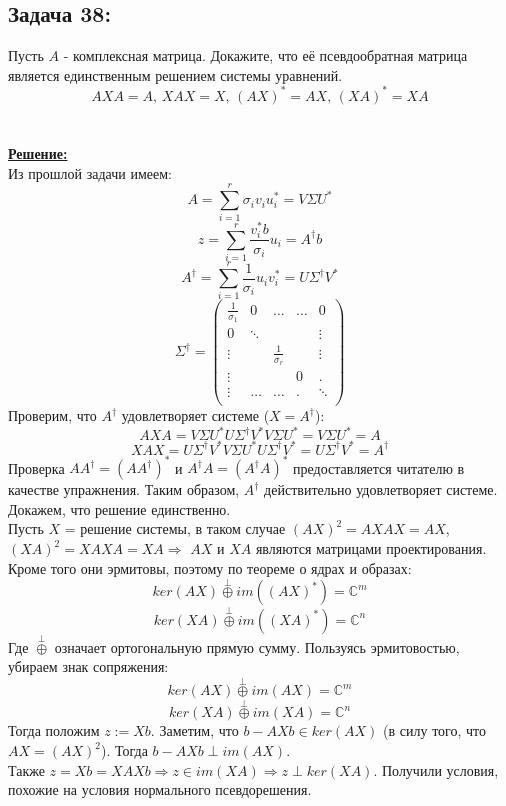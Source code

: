 \documentclass[a4paper,12pt,titlepage,final]{article}
\begin{document}
\subsection*{Задача 38:}
\noindent Пусть $A$ - комплексная матрица. Докажите, что её псевдообратная матрица является единственным решением системы уравнений.
$$AXA = A,\, XAX = X,\, (AX)^* = AX,\, (XA)^* = XA$$ \\ \\
\textbf{\underline{Решение:}} \\
Из прошлой задачи имеем:
$$A = \sum_{i=1}^{r}\sigma_i v_i u_i^* = V\Sigma U^*$$
$$z = \sum_{i=1}^{r} \frac{v_i^* b}{\sigma_i}u_i = A^\dagger b$$
$$A^\dagger = \sum_{i=1}^{r} \frac{1}{\sigma_i}u_i v_i^* = U\Sigma^\dagger V^*$$
$$\Sigma^\dagger = 
\begin{pmatrix}
\frac{1}{\sigma_1} & 0 & \ldots & \ldots & 0 \\
0 & \ddots &  &  & \vdots \\
\vdots & & \frac{1}{\sigma_r} & & \vdots \\
\vdots & & & 0 &. \\
\vdots & \ldots& \ldots&. & \ddots \\
\end{pmatrix}
$$
Проверим, что $A^\dagger$ удовлетворяет системе ($X = A^\dagger$):
$$AXA = V\Sigma U^*U\Sigma^\dagger V^* V \Sigma U^* = V\Sigma U^* = A$$
$$XAX = U\Sigma^\dagger V^*V \Sigma U^*U \Sigma^\dagger V^* = U\Sigma^\dagger V^* = A^\dagger$$
Проверка $AA^\dagger = (AA^\dagger)^*$ и $A^\dagger A = (A^\dagger A)^*$ предоставляется читателю в качестве упражнения.
Таким образом, $A^\dagger$ действительно удовлетворяет системе. Докажем, что решение единственно. \\
Пусть $X$ = решение системы, в таком случае $(AX)^2 = AXAX = AX$, $(XA)^2 = XAXA = XA \Rightarrow$ $AX$ и $XA$ являются матрицами проектирования. Кроме того они эрмитовы, поэтому по теореме о ядрах и образах:
$$ker(AX) \overset{\perp}{\oplus} im((AX)^*) = \mathbb{C}^m$$
$$ker(XA) \overset{\perp}{\oplus} im((XA)^*) = \mathbb{C}^n$$ 
Где $\overset{\perp}{\oplus}$ означает ортогональную прямую сумму. Пользуясь эрмитовостью, убираем знак сопряжения:
$$ker(AX) \overset{\perp}{\oplus} im(AX) = \mathbb{C}^m$$
$$ker(XA) \overset{\perp}{\oplus} im(XA) = \mathbb{C}^n$$ 
Тогда положим $z := Xb$. Заметим, что $b - AXb \in ker(AX)$ (в силу того, что $AX = (AX)^2$). Тогда $b - AXb \perp im(AX)$. \\
Также $z = Xb = XAXb \Rightarrow z \in im(XA) \Rightarrow z \perp ker(XA)$. Получили условия, похожие на условия нормального псевдорешения.
\end{document}
